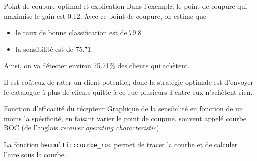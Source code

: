 \documentclass[
  ignorenonframetext,
]{beamer}
\newenvironment{Shaded}{\begin{snugshade}}{\end{snugshade}}
\newcommand{\AttributeTok}[1]{\textcolor[rgb]{0.40,0.45,0.13}{#1}}
\newcommand{\ConstantTok}[1]{\textcolor[rgb]{0.56,0.35,0.01}{#1}}
\newcommand{\DocumentationTok}[1]{\textcolor[rgb]{0.37,0.37,0.37}{\textit{#1}}}
\newcommand{\FunctionTok}[1]{\textcolor[rgb]{0.28,0.35,0.67}{#1}}
\newcommand{\NormalTok}[1]{\textcolor[rgb]{0.00,0.23,0.31}{#1}}
\newcommand{\OtherTok}[1]{\textcolor[rgb]{0.00,0.23,0.31}{#1}}
\newcommand{\SpecialCharTok}[1]{\textcolor[rgb]{0.37,0.37,0.37}{#1}}
\providecommand{\tightlist}{%
  \setlength{\itemsep}{0pt}\setlength{\parskip}{0pt}}\usepackage{longtable,booktabs,array}
\begin{document}
\begin{frame}{Point de coupure optimal et explication}
\protect\hypertarget{point-de-coupure-optimal-et-explication}{}
Dans l'exemple, le point de coupure qui maximise le gain est 0.12. Avec
ce point de coupure, on estime que

\begin{itemize}
\tightlist
\item
  le taux de bonne classification est de 79.8
\item
  la sensibilité est de 75.71.
\end{itemize}

Ainsi, on va détecter environ 75.71\% des clients qui achètent.

Il est coûteux de rater un client potentiel, donc la stratégie optimale
est d'envoyer le catalogue à plus de clients quitte à ce que plusieurs
d'entre eux n'achètent rien.
\end{frame}

\begin{frame}[fragile]{Fonction d'efficacité du récepteur}
\protect\hypertarget{fonction-defficacituxe9-du-ruxe9cepteur}{}
Graphique de la sensibilité en fonction de un moins la spécificité, en
faisant varier le point de coupure, souvent appelé courbe ROC (de
l'anglais \emph{receiver operating characteristic}).

La fonction \texttt{hecmulti::courbe\_roc} permet de tracer la courbe et
de calculer l'aire sous la courbe.

\begin{Shaded}
\end{Shaded}
\end{frame}
\end{document}
